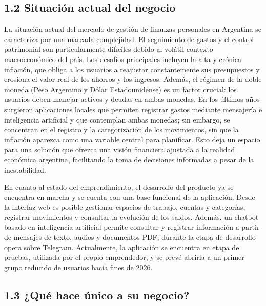 \subsection*{1.2 Situación actual del
negocio}\label{situaciuxf3n-actual-del-negocio}

La situación actual del mercado de gestión de finanzas personales en
Argentina se caracteriza por una marcada complejidad. El seguimiento de
gastos y el control patrimonial son particularmente difíciles debido al
volátil contexto macroeconómico del país. Los desafíos principales
incluyen la alta y crónica inflación, que obliga a los usuarios a
reajustar constantemente sus presupuestos y erosiona el valor real de
los ahorros y los ingresos. Además, el régimen de la doble moneda (Peso
Argentino y Dólar Estadounidense) es un factor crucial: los usuarios
deben manejar activos y deudas en ambas monedas. En los últimos años
surgieron aplicaciones locales que permiten registrar gastos mediante
mensajería e inteligencia artificial y que contemplan ambas monedas; sin
embargo, se concentran en el registro y la categorización de los
movimientos, sin que la inflación aparezca como una variable central
para planificar. Esto deja un espacio para una solución que ofrezca una
visión financiera ajustada a la realidad económica argentina,
facilitando la toma de decisiones informadas a pesar de la
inestabilidad.

En cuanto al estado del emprendimiento, el desarrollo del producto ya se
encuentra en marcha y se cuenta con una base funcional de la aplicación.
Desde la interfaz web es posible gestionar espacios de trabajo, cuentas
y categorías, registrar movimientos y consultar la evolución de los
saldos. Además, un chatbot basado en inteligencia artificial permite
consultar y registrar información a partir de mensajes de texto, audios
y documentos PDF; durante la etapa de desarrollo opera sobre Telegram.
Actualmente, la aplicación se encuentra en etapa de pruebas, utilizada
por el propio emprendedor, y se prevé abrirla a un primer grupo reducido
de usuarios hacia fines de 2026.

\subsection*{1.3 ¿Qué hace único a su
negocio?}\label{quuxe9-hace-uxfanico-a-su-negocio}

